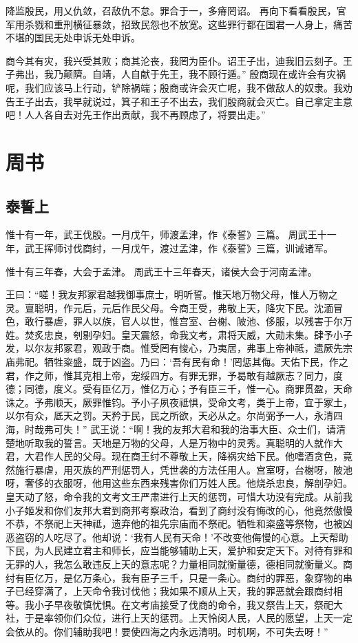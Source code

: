 \documentclass[a4paper,12pt,UTF8,twoside]{ctexbook}
\begin{document}
降监殷民，用乂仇敛，召敌仇不怠。罪合于一，多瘠罔诏。
再向下看看殷民，官军用杀戮和重刑横征暴敛，招致民怨也不放宽。这些罪行都在国君一人身上，痛苦不堪的国民无处申诉无处申诉。

商今其有灾，我兴受其败；商其沦丧，我罔为臣仆。诏王子出，迪我旧云刻子。王子弗出，我乃颠隮。自靖，人自献于先王，我不顾行遁。”
殷商现在或许会有灾祸呢，我们应该马上行动，铲除祸端；殷商或许会灭亡呢，我不做敌人的奴隶。我劝告王子出去，我早就说过，箕子和王子不出去，我们殷商就会灭亡。自己拿定主意吧！人人各自去对先王作出贡献，我不再顾虑了，将要出走。”

\part{周书}

\chapter{泰誓上}

惟十有一年，武王伐殷。一月戊午，师渡孟津，作《泰誓》三篇。
周武王十一年，武王挥师讨伐商纣，一月戊午，渡过孟津，作《泰誓》三篇，训诫诸军。


惟十有三年春，大会于孟津。
周武王十三年春天，诸侯大会于河南孟津。

王曰：“嗟！我友邦冢君越我御事庶士，明听誓。惟天地万物父母，惟人万物之灵。亶聪明，作元后，元后作民父母。今商王受，弗敬上天，降灾下民。沈湎冒色，敢行暴虐，罪人以族，官人以世，惟宫室、台榭、陂池、侈服，以残害于尔万姓。焚炙忠良，刳剔孕妇。皇天震怒，命我文考，肃将天威，大勋未集。肆予小子发，以尔友邦冢君，观政于商。惟受罔有悛心，乃夷居，弗事上帝神祗，遗厥先宗庙弗祀。牺牲粢盛，既于凶盗。乃曰：‘吾有民有命！’罔惩其侮。天佑下民，作之君，作之师，惟其克相上帝，宠绥四方。有罪无罪，予曷敢有越厥志？同力，度德；同德，度义。受有臣亿万，惟亿万心；予有臣三千，惟一心。商罪贯盈，天命诛之。予弗顺天，厥罪惟钧。予小子夙夜祗惧，受命文考，类于上帝，宜于冢土，以尔有众，厎天之罚。天矜于民，民之所欲，天必从之。尔尚弼予一人，永清四海，时哉弗可失！”
武王说：“啊！我的友邦大君和我的治事大臣、众士们，请清楚地听取我的誓言。天地是万物的父母，人是万物中的灵秀。真聪明的人就作大君，大君作人民的父母。现在商王纣不尊敬上天，降祸灾给下民。他嗜酒贪色，竟然施行暴虐，用灭族的严刑惩罚人，凭世袭的方法任用人。宫室呀，台榭呀，陂池呀，奢侈的衣服呀，他用这些东西来残害你们万姓人民。他烧杀忠良，解剖孕妇。皇天动了怒，命令我的文考文王严肃进行上天的惩罚，可惜大功没有完成。从前我小子姬发和你们友邦大君到商邦考察政治，看到了商纣没有悔改的心，他竟然傲慢不恭，不祭祀上天神祗，遗弃他的祖先宗庙而不祭祀。牺牲和粢盛等祭物，也被凶恶盗窃的人吃尽了。他却说：‘我有人民有天命！’不改变他侮慢的心意。上天帮助下民，为人民建立君主和师长，应当能够辅助上天，爱护和安定天下。对待有罪和无罪的人，我怎么敢违反上天的意志呢？力量相同就衡量德，德相同就衡量义。商纣有臣亿万，是亿万条心，我有臣子三千，只是一条心。商纣的罪恶，象穿物的串子已经穿满了，上天命令我讨伐他；我如果不顺从上天，我的罪恶就会跟商纣相等。我小子早夜敬慎忧惧。在文考庙接受了伐商的命令，我又祭告上天，祭祀大社，于是率领你们众位，进行上天的惩罚。上天怜闵人民，人民的愿望，上天一定会依从的。你们辅助我吧！要使四海之内永远清明。时机啊，不可失去呀！”
\end{document}

